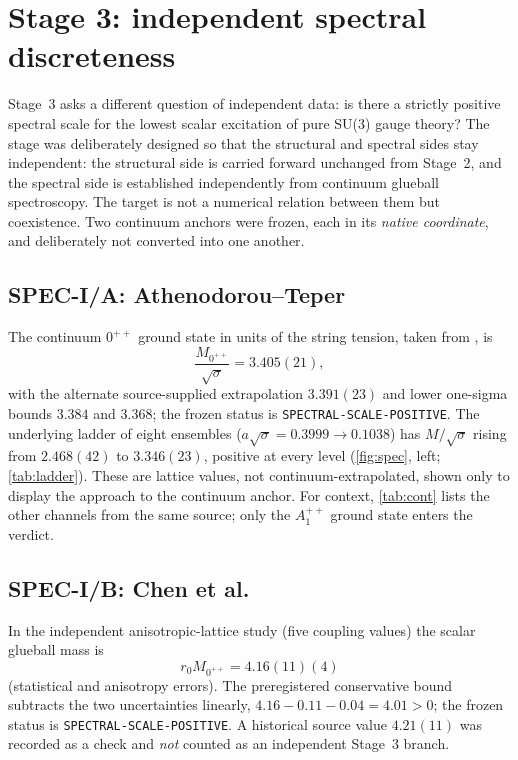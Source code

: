 \documentclass[11pt,a4paper]{article}
\theoremstyle{definition}
\theoremstyle{remark}
\newcommand{\sqs}{\sqrt{\sigma}}
\begin{document}
\section{Stage 3: independent spectral discreteness}\label{sec:stage3}

Stage~3 asks a different question of independent data: is there a strictly positive spectral scale for the lowest scalar excitation of pure SU(3) gauge theory? The stage was deliberately designed so that the structural and spectral sides stay independent: the structural side is carried forward unchanged from Stage~2, and the spectral side is established independently from continuum glueball spectroscopy. The target is not a numerical relation between them but coexistence. Two continuum anchors were frozen, each in its \emph{native coordinate}, and deliberately not converted into one another.

\subsection{SPEC-I/A: Athenodorou--Teper}
The continuum $0^{++}$ ground state in units of the string tension, taken from \cite{AT20}, is
\begin{equation}
\frac{M_{0^{++}}}{\sqs}=3.405(21),
\end{equation}
with the alternate source-supplied extrapolation $3.391(23)$ and lower one-sigma bounds $3.384$ and $3.368$; the frozen status is \texttt{SPECTRAL-\allowbreak{}SCALE-\allowbreak{}POSITIVE}. The underlying ladder of eight ensembles ($a\sqs=0.3999\to0.1038$) has $M/\sqs$ rising from $2.468(42)$ to $3.346(23)$, positive at every level (\cref{fig:spec}, left; \cref{tab:ladder}). These are lattice values, not continuum-extrapolated, shown only to display the approach to the continuum anchor. For context, \cref{tab:cont} lists the other channels from the same source; only the $A_1^{++}$ ground state enters the verdict.

\subsection{SPEC-I/B: Chen et al.}
In the independent anisotropic-lattice study \cite{Chen06} (five coupling values) the scalar glueball mass is
\begin{equation}
r_0 M_{0^{++}}=4.16(11)(4)
\end{equation}
(statistical and anisotropy errors). The preregistered conservative bound subtracts the two uncertainties linearly, $4.16-0.11-0.04=4.01>0$; the frozen status is \texttt{SPECTRAL-\allowbreak{}SCALE-\allowbreak{}POSITIVE}. A historical source value $4.21(11)$ was recorded as a check and \emph{not} counted as an independent Stage~3 branch.
\end{document}

